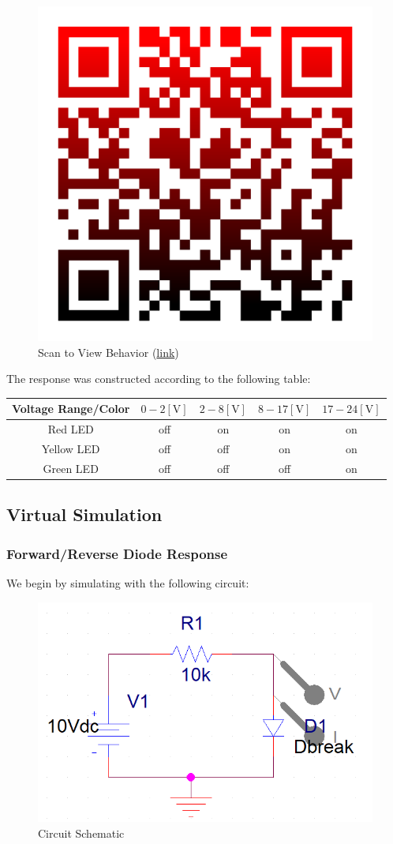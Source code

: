 \documentclass[
	letterpaper, %
	10pt, %
]{CSUniSchoolLabReport}
\begin{document}
  \begin{figure}[H]
    \centering
    \includegraphics[width=.4\textwidth]{Figures/L2F4}
    \caption{Scan to View Behavior (\href{http://michael.brodskiy.com/Diodes.mp4}{link})}
    \label{fig:5}
  \end{figure}

  The response was constructed according to the following table:

  \begin{center}
    \begin{tabular}[H]{|c|c|c|c|c|}
      \hline
      Voltage Range/Color & $0-2[\si{\volt}]$ & $2-8[\si{\volt}]$ & $8-17[\si{\volt}]$ & $17-24[\si{\volt}]$\\
      \hline
      Red LED & off & on & on & on\\
      \hline
      Yellow LED & off & off & on & on\\
      \hline
      Green LED & off & off & off & on\\
      \hline
    \end{tabular}
  \end{center}

  \subsection{Virtual Simulation}

  \subsubsection{Forward/Reverse Diode Response}

  We begin by simulating with the following circuit:

  \begin{figure}[H]
    \centering
    \includegraphics[width=.9\textwidth]{Figures/L2F9}
    \caption{Circuit Schematic}
    \label{fig:6}
  \end{figure}
\end{document}
